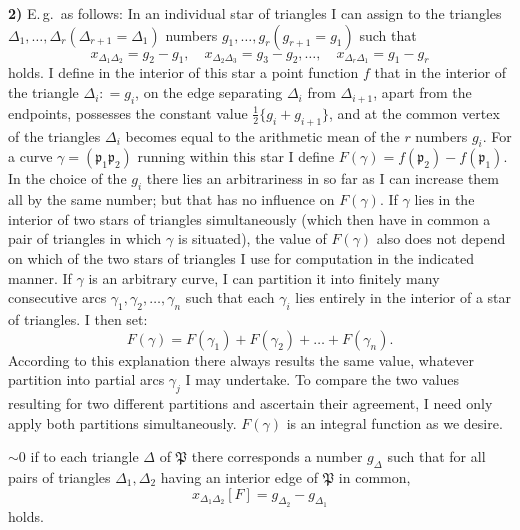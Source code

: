 \documentclass{article}
\begin{document}
\textbf{2)} E.\,g.\ as follows: In an individual star of triangles I can assign to the triangles $\Delta_1, \dots, \Delta_r (\Delta_{r+1} = \Delta_1)$ numbers $g_1, \dots, g_r (g_{r+1} = g_1)$ such that
\[ x_{\Delta_1 \Delta_2} = g_2 - g_1, \quad x_{\Delta_2 \Delta_3} = g_3 - g_2, \dots, \quad x_{\Delta_r \Delta_1} = g_1 - g_r \]
holds. I define in the interior of this star a point function $f$ that in the interior of the triangle $\Delta_i\colon = g_i$, on the edge separating $\Delta_i$ from $\Delta_{i+1}$, apart from the endpoints, possesses the constant value $\frac{1}{2} \{g_i + g_{i+1}\}$, and at the common vertex of the triangles $\Delta_i$ becomes equal to the arithmetic mean of the $r$ numbers $g_i$. For a curve $\gamma = (\mathfrak{p}_1 \mathfrak{p}_2)$ running within this star I define $F(\gamma) = f(\mathfrak{p}_2) - f(\mathfrak{p}_1)$. In the choice of the $g_i$ there lies an arbitrariness in so far as I can increase them all by the same number; but that has no influence on $F(\gamma)$. If $\gamma$ lies in the interior of two stars of triangles simultaneously (which then have in common a pair of triangles in which $\gamma$ is situated), the value of $F(\gamma)$ also does not depend on which of the two stars of triangles I use for computation in the indicated manner. If $\gamma$ is an arbitrary curve, I can partition it into finitely many consecutive arcs $\gamma_1, \gamma_2, \dots, \gamma_n$ such that each $\gamma_i$ lies entirely in the interior of a star of triangles. I then set:
\[ F(\gamma) = F(\gamma_1) + F(\gamma_2) + \dots + F(\gamma_n). \]
According to this explanation there always results the same value, whatever partition into partial arcs $\gamma_j$ I may undertake. To compare the two values resulting for two different partitions and ascertain their agreement, I need only apply both partitions simultaneously. $F(\gamma)$ is an integral function as we desire.

$\sim 0$ if to each triangle $\Delta$ of $\mathfrak{P}$ there corresponds a number $g_\Delta$ such that for all pairs of triangles $\Delta_1, \Delta_2$ having an interior edge of $\mathfrak{P}$ in common,
\[ x_{\Delta_1 \Delta_2} [F] = g_{\Delta_2} - g_{\Delta_1} \]
holds.
\end{document}

